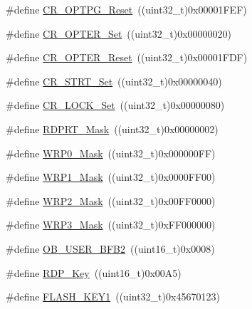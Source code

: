\begin{DoxyCompactItemize}
\#define \hyperlink{group___f_l_a_s_h___private___defines_ga9dd2ca46f4e8edfa098e1481699c08b7}{C\+R\+\_\+\+O\+P\+T\+P\+G\+\_\+\+Reset}~((uint32\+\_\+t)0x00001\+F\+E\+F)
\item 
\#define \hyperlink{group___f_l_a_s_h___private___defines_gac5707368555a5b7400eea1e306b62b16}{C\+R\+\_\+\+O\+P\+T\+E\+R\+\_\+\+Set}~((uint32\+\_\+t)0x00000020)
\item 
\#define \hyperlink{group___f_l_a_s_h___private___defines_ga0245cfe194895f1ad98ba66f8eda3e47}{C\+R\+\_\+\+O\+P\+T\+E\+R\+\_\+\+Reset}~((uint32\+\_\+t)0x00001\+F\+D\+F)
\item 
\#define \hyperlink{group___f_l_a_s_h___private___defines_ga0e6349818d8602ffffc56e5e04d9ab13}{C\+R\+\_\+\+S\+T\+R\+T\+\_\+\+Set}~((uint32\+\_\+t)0x00000040)
\item 
\#define \hyperlink{group___f_l_a_s_h___private___defines_gaee27a8100366266daa8d3a69c589e4b9}{C\+R\+\_\+\+L\+O\+C\+K\+\_\+\+Set}~((uint32\+\_\+t)0x00000080)
\item 
\#define \hyperlink{group___f_l_a_s_h___private___defines_gaa624b669116384b971b838ae201cad9f}{R\+D\+P\+R\+T\+\_\+\+Mask}~((uint32\+\_\+t)0x00000002)
\item 
\#define \hyperlink{group___f_l_a_s_h___private___defines_ga79707964cbd409601e1ddf6064cf1c5c}{W\+R\+P0\+\_\+\+Mask}~((uint32\+\_\+t)0x000000\+F\+F)
\item 
\#define \hyperlink{group___f_l_a_s_h___private___defines_gaa2b2535ba91736dd2d6baa92068686e0}{W\+R\+P1\+\_\+\+Mask}~((uint32\+\_\+t)0x0000\+F\+F00)
\item 
\#define \hyperlink{group___f_l_a_s_h___private___defines_ga4676f67c7be97a09eb1c6a5753ce0523}{W\+R\+P2\+\_\+\+Mask}~((uint32\+\_\+t)0x00\+F\+F0000)
\item 
\#define \hyperlink{group___f_l_a_s_h___private___defines_ga649ce8b78520ca192b41aabe2daef035}{W\+R\+P3\+\_\+\+Mask}~((uint32\+\_\+t)0x\+F\+F000000)
\item 
\#define \hyperlink{group___f_l_a_s_h___private___defines_ga5098bd938dadebbbdf9e628c84b2dcf0}{O\+B\+\_\+\+U\+S\+E\+R\+\_\+\+B\+F\+B2}~((uint16\+\_\+t)0x0008)
\item 
\#define \hyperlink{group___f_l_a_s_h___private___defines_ga34ec82060edcc9a18bf804b07dec5881}{R\+D\+P\+\_\+\+Key}~((uint16\+\_\+t)0x00\+A5)
\item 
\#define \hyperlink{group___f_l_a_s_h___private___defines_gafd77e7bf91765d891ce63e2f0084b019}{F\+L\+A\+S\+H\+\_\+\+K\+E\+Y1}~((uint32\+\_\+t)0x45670123)
\item 

\end{DoxyCompactItemize}

